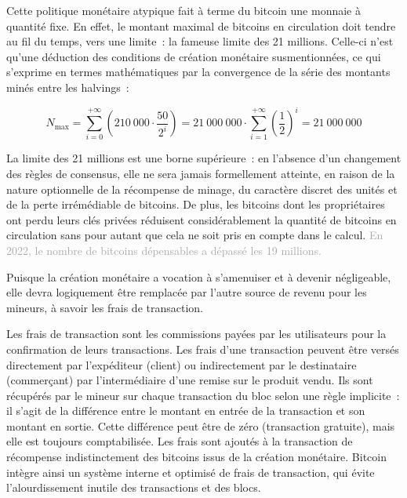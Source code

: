 Cette politique monétaire atypique fait à terme du bitcoin une monnaie à quantité fixe. En effet, le montant maximal de bitcoins en circulation doit tendre au fil du temps, vers une limite~: la fameuse limite des 21 millions. Celle-ci n'est qu'une déduction des conditions de création monétaire susmentionnées, ce qui s'exprime en termes mathématiques par la convergence de la série des montants minés entre les halvings~:

{ \small
\[
N_{\mathrm{max}} = \sum_{i=0}^{+\infty} \left( {210~000 \cdot \frac{50}{2^i}} \right) = 21~000~000 \cdot \sum_{i=1}^{+\infty} \left(\frac{1}{2}\right)^i = 21~000~000
\]
}

La limite des 21 millions est une borne supérieure~: en l'absence d'un changement des règles de consensus, elle ne sera jamais formellement atteinte, en raison de la nature optionnelle de la récompense de minage, du caractère discret des unités et de la perte irrémédiable de bitcoins. De plus, les bitcoins dont les propriétaires ont perdu leurs clés privées réduisent considérablement la quantité de bitcoins en circulation sans pour autant que cela ne soit pris en compte dans le calcul. \textcolor{darkgray}{En 2022, le nombre de bitcoins dépensables a dépassé les 19 millions.}

Puisque la création monétaire a vocation à s'amenuiser et à devenir négligeable, elle devra logiquement être remplacée par l'autre source de revenu pour les mineurs, à savoir les frais de transaction.

Les frais de transaction sont les commissions payées par les utilisateurs pour la confirmation de leurs transactions. Les frais d'une transaction peuvent être versés directement par l'expéditeur (client) ou indirectement par le destinataire (commerçant) par l'intermédiaire d'une remise sur le produit vendu. Ils sont récupérés par le mineur sur chaque transaction du bloc selon une règle implicite~: il s'agit de la différence entre le montant en entrée de la transaction et son montant en sortie. Cette différence peut être de zéro (transaction gratuite), mais elle est toujours comptabilisée. Les frais sont ajoutés à la transaction de récompense indistinctement des bitcoins issus de la création monétaire. Bitcoin intègre ainsi un système interne et optimisé de frais de transaction, qui évite l'alourdissement inutile des transactions et des blocs.

